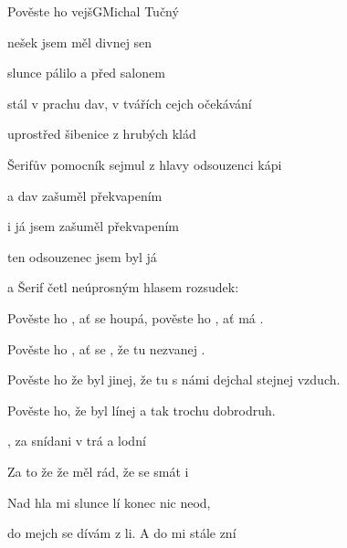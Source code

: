 \setcounter{page}{69}
\begin{song}{Pověste ho vejš}{G}{Michal Tučný}

\begin{SBChorus*}

nešek jsem měl divnej sen

slunce pálilo a před salonem

stál v prachu dav, v tvářích cejch očekávání

uprostřed šibenice z hrubých klád

Šerifův pomocník sejmul z hlavy odsouzenci kápi

a dav zašuměl překvapením

i já jsem zašuměl překvapením

ten odsouzenec jsem byl já

a Šerif četl neúprosným hlasem rozsudek:

\end{SBChorus*}

\begin{SBVerse}

Pověste ho , ať se houpá, pověste ho , ať má .

Pověste ho , ať se , že tu  nezvanej .

\end{SBVerse}

\begin{SBVerse}

Pověste ho že byl jinej, že tu s námi dejchal stejnej vzduch.

Pověste ho, že byl línej a tak trochu dobrodruh.

\end{SBVerse}

\begin{SBVerse}

, za snídani v trá a lodní 

Za to že   že měl  rád, že se  smát i 

\end{SBVerse}

\begin{SBChorus}

Nad hla mi slunce lí konec  nic neod,

do mejch  se dívám z li. A do  mi stále zní


\end{SBChorus}
\end{song}
